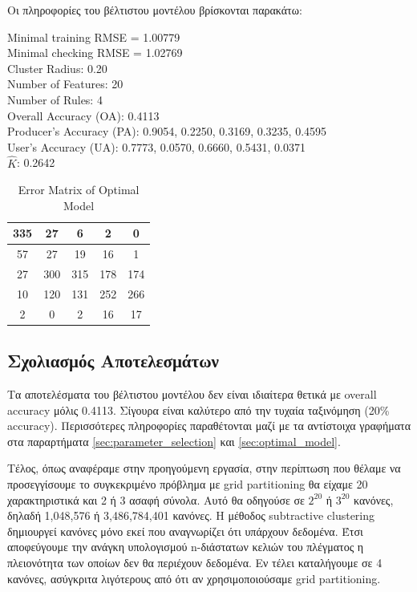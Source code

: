\documentclass[12pt]{report}
\begin{document}
Οι πληροφορίες του βέλτιστου μοντέλου βρίσκονται παρακάτω:
\begin{tcolorbox}[title=Optimal Model, colback=gray!50, colframe=black]
Minimal training RMSE = 1.00779 \\
Minimal checking RMSE = 1.02769 \\
Cluster Radius: 0.20 \\
Number of Features: 20 \\
Number of Rules: 4 \\
Overall Accuracy (OA): 0.4113 \\
Producer's Accuracy (PA): 0.9054, 0.2250, 0.3169, 0.3235, 0.4595 \\
User's Accuracy (UA): 0.7773, 0.0570, 0.6660, 0.5431, 0.0371 \\
$\hat{K}$: 0.2642
\end{tcolorbox}

\begin{table}[H]
    \centering
    \begin{tabular}{|c|c|c|c|c|}
        \hline
        335 & 27  & 6   & 2   & 0   \\
        \hline
        57  & 27  & 19  & 16  & 1   \\
        \hline
        27  & 300 & 315 & 178 & 174 \\
        \hline
        10  & 120 & 131 & 252 & 266 \\
        \hline
        2   & 0   & 2   & 16  & 17  \\
        \hline
    \end{tabular}
    \caption{Error Matrix of Optimal Model}
\end{table}

\subsection{Σχολιασμός Αποτελεσμάτων}
Τα αποτελέσματα του βέλτιστου μοντέλου δεν είναι ιδιαίτερα θετικά με overall accuracy μόλις 0.4113. Σίγουρα είναι καλύτερο από την τυχαία ταξινόμηση (20\% accuracy). Περισσότερες πληροφορίες παραθέτονται μαζί με τα αντίστοιχα γραφήματα στα παραρτήματα \ref{sec:parameter_selection} και \ref{sec:optimal_model}.

Τέλος, όπως αναφέραμε στην προηγούμενη εργασία, στην περίπτωση που θέλαμε να προσεγγίσουμε το συγκεκριμένο πρόβλημα με grid partitioning θα είχαμε 20 χαρακτηριστικά και 2 ή 3 ασαφή σύνολα. Αυτό θα οδηγούσε σε $2^{20}$ ή $3^{20}$ κανόνες, δηλαδή 1,048,576 ή 3,486,784,401 κανόνες. Η μέθοδος subtractive clustering δημιουργεί κανόνες μόνο εκεί που αναγνωρίζει ότι υπάρχουν δεδομένα. Έτσι αποφεύγουμε την ανάγκη υπολογισμού n-διάστατων κελιών του πλέγματος η πλειονότητα των οποίων δεν θα περιέχουν δεδομένα. Εν τέλει καταλήγουμε σε 4 κανόνες, ασύγκριτα λιγότερους από ότι αν χρησιμοποιούσαμε grid partitioning.
\end{document}
